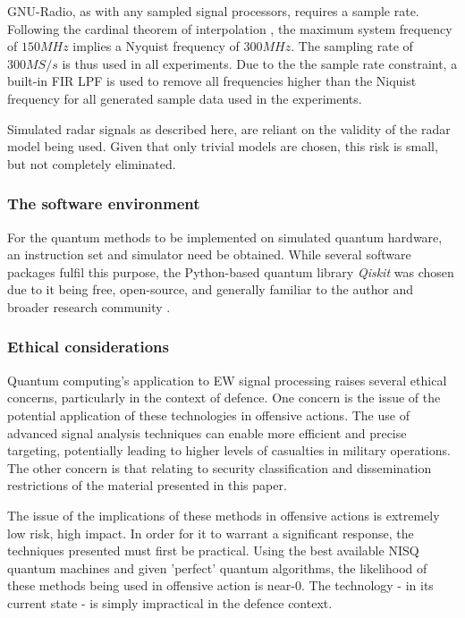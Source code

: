 GNU-Radio, as with any sampled signal processors, requires a sample rate.
Following the cardinal theorem of interpolation \cite{nyquist_certain_1928}, the maximum system frequency of \(150MHz\) implies a Nyquist frequency of \(300MHz\).
The sampling rate of \(300MS/s\) is thus used in all experiments.
Due to the the sample rate constraint, a built-in \ac{FIR} \ac{LPF} is used to remove all frequencies higher than the Niquist frequency for all generated sample data used in the experiments.

Simulated radar signals as described here, are reliant on the validity of the radar model being used.
Given that only trivial models are chosen, this risk is small, but not completely eliminated.

\subsubsection{The software environment}

For the quantum methods to be implemented on simulated quantum hardware, an instruction set and simulator need be obtained. 
While several software packages fulfil this purpose, the Python-based quantum library \textit{Qiskit} \cite{qiskit_contributors_qiskit_2023} was chosen due to it being free, open-source, and generally familiar to the author and broader research community \cite{garhwal_quantum_2021}.

\subsubsection{Ethical considerations}

Quantum computing's application to \ac{EW} signal processing raises several ethical concerns, particularly in the context of defence.
One concern is the issue of the potential application of these technologies in offensive actions.
The use of advanced signal analysis techniques can enable more efficient and precise targeting, potentially leading to higher levels of casualties in military operations.
The other concern is that relating to security classification and dissemination restrictions of the material presented in this paper.

The issue of the implications of these methods in offensive actions is extremely low risk, high impact.
In order for it to warrant a significant response, the techniques presented must first be practical.
Using the best available \ac{NISQ} quantum machines and given 'perfect' quantum algorithms, the likelihood of these methods being used in offensive action is near-0.
The technology - in its current state - is simply impractical in the defence context.


